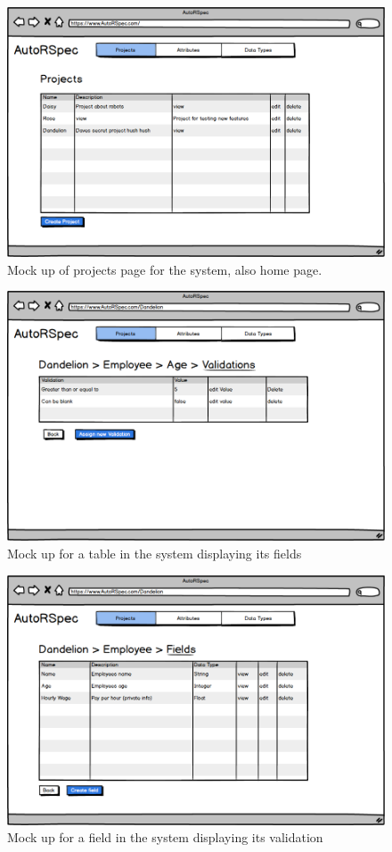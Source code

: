 \documentclass[a4paper,12pt]{article}
\begin{document}
\begin{figure}
\includegraphics[width=\linewidth]{screenshots/muhome}
\caption{Mock up of projects page for the system, also home page. }
\label{fig:mu1}
\end{figure}

\begin{figure}
\includegraphics[width=\linewidth]{screenshots/mutable}
\caption{Mock up for a table in the system displaying its fields}
\label{fig:mu2}
\end{figure}

\begin{figure}
\includegraphics[width=\linewidth]{screenshots/mutablefields}
\caption{Mock up for a field in the system displaying its validation}
\label{fig:mu3}
\end{figure}
\end{document}
